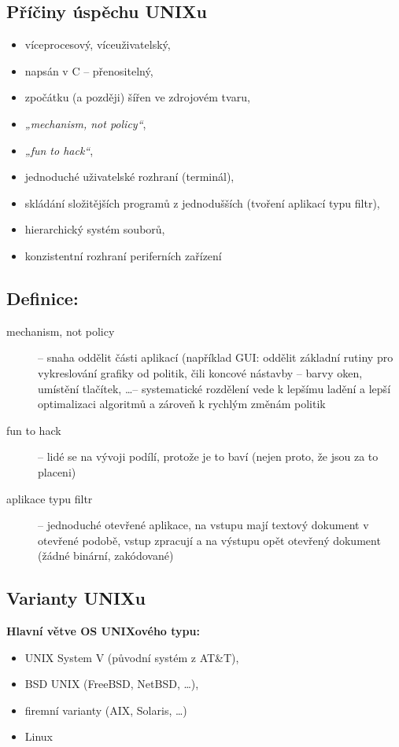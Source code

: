 \documentclass[a4paper, 11pt]{article}
\begin{document}
\subsection{Příčiny úspěchu UNIXu}
\begin{itemize}
    \item víceprocesový, víceuživatelský,
    \item napsán v C -- přenositelný,
    \item zpočátku (a později) šířen ve zdrojovém tvaru,
    \item \emph{„mechanism, not policy“},
    \item \emph{„fun to hack“},
    \item jednoduché uživatelské rozhraní (terminál),
    \item skládání složitějších programů z jednodušších (tvoření aplikací typu filtr),
    \item hierarchický systém souborů,
    \item konzistentní rozhraní periferních zařízení
\end{itemize}

\subsection*{Definice:}
\begin{description}
\item[mechanism, not policy] -- snaha oddělit části aplikací (například GUI: oddělit základní rutiny pro vykreslování grafiky od politik, čili koncové nástavby -- barvy oken, umístění tlačítek, \ldots -- systematické rozdělení vede k lepšímu ladění a lepší optimalizaci algoritmů a zároveň k rychlým změnám politik

\item[fun to hack] -- lidé se na vývoji podílí, protože je to baví (nejen proto, že jsou za to placeni)

\item[aplikace typu filtr] -- jednoduché otevřené aplikace, na vstupu mají textový dokument v otevřené podobě, vstup zpracují a na výstupu opět otevřený dokument (žádné binární, zakódované)
\end{description}

\subsection{Varianty UNIXu}
\textbf{Hlavní větve OS UNIXového typu:}
\begin{itemize}
    \item UNIX System V (původní systém z AT\&T),
    \item BSD UNIX (FreeBSD, NetBSD, \ldots),
    \item firemní varianty (AIX, Solaris, \ldots)
    \item Linux
\end{itemize}
 
\end{document}
